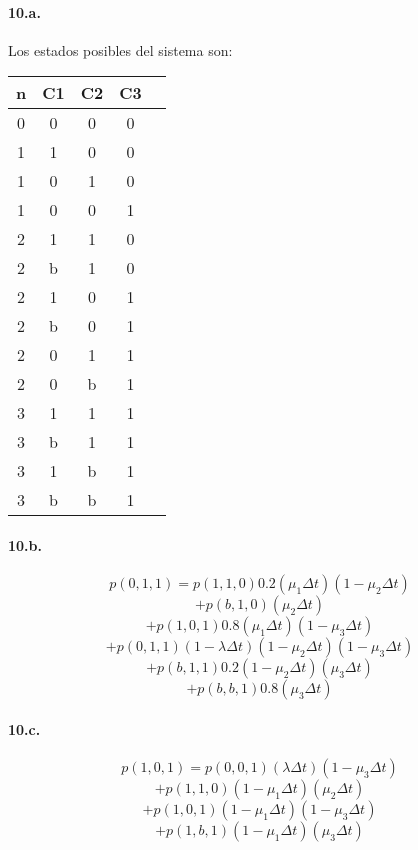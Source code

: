 \documentclass{article}
\begin{document}
   \paragraph{10.a.} Los estados posibles del sistema son:
   \begin{center}
   \begin{tabular}{|| c | c | c | c | c ||}
   \hline 
      n & C1 & C2 & C3 \\ \hline \hline
      0 & 0  & 0  & 0   \\ \hline \hline
      1 & 1  & 0  & 0    \\ \hline 
      1 & 0  & 1  & 0    \\ \hline
      1 & 0  & 0  & 1    \\ \hline \hline
      2 & 1  & 1  & 0   \\ \hline
      2 & b  & 1  & 0    \\ \hline
      2 & 1  & 0  & 1    \\ \hline
      2 & b  & 0  & 1    \\ \hline
      2 & 0  & 1  & 1    \\ \hline
      2 & 0  & b  & 1    \\ \hline \hline
      3 & 1  & 1  & 1    \\ \hline
      3 & b  & 1  & 1    \\ \hline
      3 & 1  & b  & 1    \\ \hline
      3 & b  & b  & 1    \\ \hline
   \end{tabular}
   \end{center}


   \paragraph{10.b.}
      $$p(0,1,1) = p(1,1,0) 0.2 (\mu_1 \Delta t) (1 - \mu_2 \Delta t) $$
      $$           + p(b,1,0) (\mu_2 \Delta t) $$
      $$           + p(1,0,1) 0.8 (\mu_1 \Delta t) (1 - \mu_3 \Delta t) $$
      $$           + p(0,1,1) (1 - \lambda \Delta t) (1 - \mu_2 \Delta t) (1 - \mu_3 \Delta t) $$
      $$           + p(b,1,1) 0.2 (1 - \mu_2 \Delta t) (\mu_3 \Delta t) $$
      $$           + p(b,b,1) 0.8 (\mu_3 \Delta t) $$

   \paragraph{10.c.}
      $$p(1,0,1) = p(0,0,1) (\lambda \Delta t) (1 - \mu_3 \Delta t) $$
      $$           + p(1,1,0) (1 - \mu_1 \Delta t)(\mu_2 \Delta t) $$
      $$           + p(1,0,1) (1 - \mu_1 \Delta t) (1 - \mu_3 \Delta t) $$
      $$           + p(1,b,1) (1 - \mu_1 \Delta t) (\mu_3 \Delta t) $$
\end{document}
